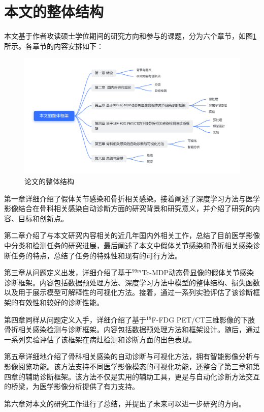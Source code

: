 \section{本文的整体结构}

本文基于作者攻读硕士学位期间的研究方向和参与的课题，分为六个章节，如图\ref{fig:chap01_structure}所示。各章节的内容安排如下：

\begin{figure}[htbp]
  \centering
  \includegraphics[width=\textwidth]{figures/chap01_structure_light.png}
  \caption{论文的整体结构}
  \label{fig:chap01_structure}
\end{figure}

第一章详细介绍了假体关节感染和骨折相关感染。接着阐述了深度学习方法与医学影像结合在骨科相关感染自动诊断方面的研究背景和研究意义，并介绍了研究的内容、目标和创新点。

第二章介绍了与本文研究内容相关的近几年国内外相关工作，总结了目前医学影像中分类和检测任务的研究进展，最后阐述了本文中假体关节感染和骨折相关感染诊断任务的特点，总结了任务的特殊性和现有的可行方法。

第三章从问题定义出发，详细介绍了基于\(^{99m}\)Tc-MDP动态骨显像的假体关节感染诊断框架。内容包括数据预处理方法、深度学习方法中模型的整体结构、损失函数以及用于展示模型可解释性的可视化方法。接着，通过一系列实验评估了该诊断框架的有效性和较好的诊断性能。

第四章同样从问题定义入手，详细介绍了基于\(^{18}\)F-FDG PET/CT三维影像的下肢骨折相关感染检测与诊断框架。内容包括数据预处理方法和框架设计。随后，通过一系列实验评估了该框架在病灶检测和诊断方面的出色表现。

第五章详细地介绍了骨科相关感染的自动诊断与可视化方法，拥有智能影像分析与影像阅览功能。该方法支持不同医学影像模态的可视化功能，还整合了第三章和第四章的辅助诊断框架。该方法不仅是实用的辅助工具，更是与自动化诊断方法交互的桥梁，为医学影像分析提供了有力支持。

第六章对本文的研究工作进行了总结，并提出了未来可以进一步研究的方向。












